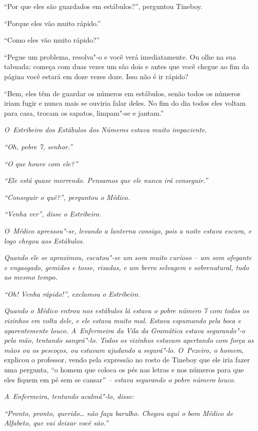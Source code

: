 ``Por que eles são guardados em estábulos?'', perguntou Tineboy.

``Porque eles vão muito rápido.''

``Como eles vão muito rápido?''

``Pegue um problema, resolva"-o e você verá imediatamente. Ou olhe na sua
tabuada: começa com duas vezes um são dois e antes que você chegue ao
fim da página você estará em doze vezes doze. Isso não é ir rápido?

``Bem, eles têm de guardar os números em estábulos, senão todos os
números iriam fugir e nunca mais se ouviria falar deles. No fim do dia
todos eles voltam para casa, trocam os sapatos, limpam"-se e jantam.''

\emph{O~Estribeiro dos Estábulos dos Números estava muito impaciente.}

\emph{``Oh, pobre 7, senhor.''}

\emph{``O que houve com ele?''}

\emph{``Ele está quase morrendo. Pensamos que ele nunca irá
conseguir.''}

\emph{``Conseguir o quê?'', perguntou o Médico.}

\emph{``Venha ver'', disse o Estribeiro.}

\emph{O~Médico apressou"-se, levando a lanterna consigo, pois a noite
estava escura, e logo chegou aos Estábulos.}

\emph{Quando ele se aproximou, escutou"-se um som muito curioso -- um som
ofegante e engasgado, gemidos e tosse, risadas, e um berro selvagem e
sobrenatural, tudo ao mesmo tempo.}

\emph{``Oh! Venha rápido!'', exclamou o Estribeiro.}

\emph{Quando o Médico entrou nos estábulos lá estava o pobre número 7
com todos os vizinhos em volta dele, e ele estava muito mal. Estava
espumando pela boca e aparentemente louco. A~Enfermeira da Vila da
Gramática estava segurando"-o pela mão, tentando sangrá"-lo. Todos os
vizinhos estavam apertando com força as mãos ou os pescoços, ou estavam
ajudando a segurá"-lo. O~Pezeiro, o homem}, explicou o professor, vendo
pela expressão no rosto de Tineboy que ele iria fazer uma pergunta, ``o
homem que coloca os pés nas letras e nos números para que eles fiquem em
pé sem se cansar'' \emph{-- estava segurando o pobre número louco.}

\emph{A~Enfermeira, tentando acalmá"-lo, disse:}

\emph{``Pronto, pronto, querido… não faça barulho. Chegou aqui o
bom Médico de Alfabeto, que vai deixar você são.''}


